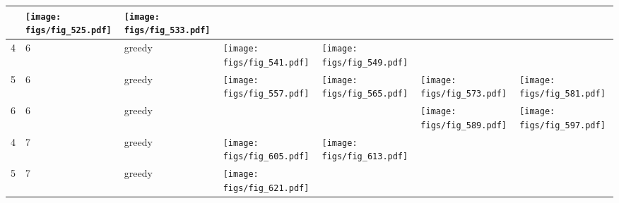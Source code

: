 \documentclass[oneside,canadian,landscape]{article}
\begin{document}
\begin{center}
\begin{longtable}{|l|l|l||l|l|l|l|}
\begin{minipage}{3.5cm}
\end{minipage}
&\begin{minipage}{3.5cm}
\texttt{[image: figs/fig\_525.pdf]}
\end{minipage}
&\begin{minipage}{3.5cm}
\texttt{[image: figs/fig\_533.pdf]}
\end{minipage}
\\ \hline
4&6&greedy&\begin{minipage}{3.5cm}
\texttt{[image: figs/fig\_541.pdf]}
\end{minipage}
&\begin{minipage}{3.5cm}
\texttt{[image: figs/fig\_549.pdf]}
\end{minipage}
&&\\ \hline
5&6&greedy&\begin{minipage}{3.5cm}
\texttt{[image: figs/fig\_557.pdf]}
\end{minipage}
&\begin{minipage}{3.5cm}
\texttt{[image: figs/fig\_565.pdf]}
\end{minipage}
&\begin{minipage}{3.5cm}
\texttt{[image: figs/fig\_573.pdf]}
\end{minipage}
&\begin{minipage}{3.5cm}
\texttt{[image: figs/fig\_581.pdf]}
\end{minipage}
\\ \hline
6&6&greedy&&&\begin{minipage}{3.5cm}
\texttt{[image: figs/fig\_589.pdf]}
\end{minipage}
&\begin{minipage}{3.5cm}
\texttt{[image: figs/fig\_597.pdf]}
\end{minipage}
\\ \hline
4&7&greedy&\begin{minipage}{3.5cm}
\texttt{[image: figs/fig\_605.pdf]}
\end{minipage}
&\begin{minipage}{3.5cm}
\texttt{[image: figs/fig\_613.pdf]}
\end{minipage}
&&\\ \hline
5&7&greedy&\begin{minipage}{3.5cm}
\texttt{[image: figs/fig\_621.pdf]}
\end{minipage}
&\begin{minipage}{3.5cm}

\end{minipage}
\end{longtable}
\end{center}
\end{document}
